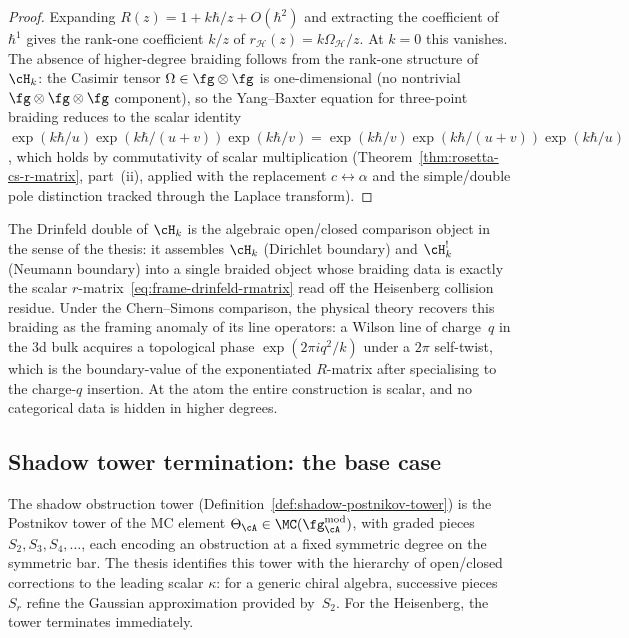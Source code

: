 \begin{proof}
Expanding $R(z) = 1 + k\hbar/z + O(\hbar^2)$ and extracting the
coefficient of $\hbar^1$ gives the rank-one coefficient $k/z$ of
$r_{\mathcal H}(z)=k\Omega_{\mathcal H}/z$. At $k = 0$ this
vanishes. The absence of higher-degree braiding follows from the
rank-one structure of $\cH_k$: the Casimir tensor
$\Omega \in \fg\otimes\fg$ is one-dimensional (no nontrivial
$\fg\otimes\fg\otimes\fg$ component), so the Yang--Baxter equation
for three-point braiding reduces to the scalar identity
$\exp(k\hbar/u)\exp(k\hbar/(u+v))\exp(k\hbar/v)
= \exp(k\hbar/v)\exp(k\hbar/(u+v))\exp(k\hbar/u)$,
which holds by commutativity of scalar multiplication
(Theorem~\ref{thm:rosetta-cs-r-matrix}, part~(ii), applied with
the replacement $c \leftrightarrow \alpha$ and the simple/double
pole distinction tracked through the Laplace transform).
\end{proof}

The Drinfeld double of $\cH_k$ is the algebraic open/closed comparison
object in the sense of the thesis: it assembles $\cH_k$
(Dirichlet boundary) and $\cH_k^!$ (Neumann boundary) into a single
braided object whose braiding data is exactly the scalar
$r$-matrix~\eqref{eq:frame-drinfeld-rmatrix} read off the
Heisenberg collision residue. Under the Chern--Simons comparison,
the physical theory recovers this braiding as the framing anomaly of
its line operators:
a Wilson line of charge~$q$ in the 3d bulk acquires a topological
phase $\exp(2\pi i q^2/k)$ under a $2\pi$ self-twist, which is the
boundary-value of the exponentiated $R$-matrix after specialising
to the charge-$q$ insertion. At the atom the entire construction
is scalar, and no categorical data is hidden in higher degrees.

\subsection{Shadow tower termination: the base case}
\label{subsec:frame-thesis-shadow-base-case}

The shadow obstruction tower (Definition~\ref{def:shadow-postnikov-tower})
is the Postnikov tower of the MC element
$\Theta_{\cA} \in \MC(\fg^{\mathrm{mod}}_{\cA})$, with graded
pieces $S_2, S_3, S_4, \ldots$, each encoding an obstruction at a
fixed symmetric degree on the symmetric bar. The thesis identifies
this tower with the hierarchy of open/closed corrections to the
leading scalar $\kappa$: for a generic chiral algebra, successive
pieces $S_r$ refine the Gaussian approximation provided by~$S_2$.
For the Heisenberg, the tower terminates immediately.

